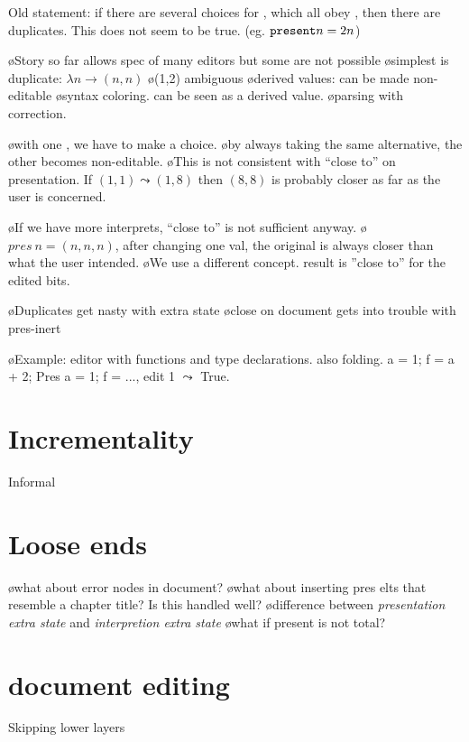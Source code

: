 Old statement: if there are several choices for \interpret, which all obey , then there are duplicates. This does not seem to be true. (eg. ${\tt present} n = 2n$)


\bl
\o Story so far allows spec of many editors but some are not possible
\o simplest is duplicate: $\lambda n \to (n,n)$
\o (1,2) ambiguous
\o derived values: can be made non-editable
\o syntax coloring. can be seen as a derived value.
\o parsing with correction. 
\el

\bl
\o with one \interpret, we have to make a choice.
\o by always taking the same alternative, the other becomes non-editable.
\o This is not consistent with ``close to'' on presentation.  If $(1,1) \leadsto (1,8)$ then $(8,8)$ is probably closer as far as the user is concerned.
\el

\bl
\o If we have more interprets, ``close to'' is not sufficient anyway.
\o $pres~n = (n,n,n)$, after changing one val, the original is always closer than what the user intended.
\o We use a different concept. result is ''close to'' for the edited bits.
\el

\bl
\o Duplicates get nasty with extra state
\o close on document gets into trouble with pres-inert
\el

\bl
\o Example: editor with functions and type declarations. also folding. a = 1; f = a + 2; Pres a = 1; f = ..., edit 1 $\leadsto$ True. 
\el


%																
%																
%																
\section{Incrementality}
Informal


%																
%																
%																
\section{Loose ends}
\bl
\o what about error nodes in document?
\o what about inserting pres elts that resemble a chapter title? Is this handled well?
\o difference between {\em presentation extra state} and {\em interpretion extra state}
\o what if present is not total?
\el


%																
%																
%																
\section{document editing}
Skipping lower layers

